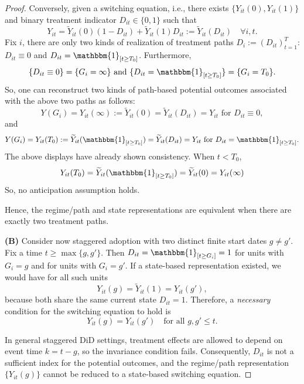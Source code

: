 \documentclass[12pt]{article}
\renewcommand{\(}{\left(}%
\renewcommand{\)}{\right)}%
\renewcommand{\[}{\left[}%
\renewcommand{\]}{\right]}%
\newtheorem{proof}{Proof.}}
\begin{document}
\begin{proof}
\medskip
Conversely, given a switching equation, i.e., there exists $\{Y_{it}(0),Y_{it}(1)\}$ and binary treatment indicator $D_{it}\in\{0,1\}$ such that
\begin{equation*}
Y_{it}=\widetilde Y_{it}(0)(1-D_{it})+\widetilde Y_{it}(1)D_{it}:=\widetilde Y_{it}(D_{it})\quad \forall i,t .
\end{equation*}
Fix $i$, there are only two kinds of realization of treatment paths $D_i:=(D_{it})_{t=1}^T$: $D_{it}\equiv 0$ and $D_{it}=\mathbbm{1}_{[t\geq T_0]}$. Furthermore, 
\begin{equation*}
	  \{D_{it}\equiv 0\}=\{G_i=\infty\} \text{ and }\{D_{it}=\mathbbm{1}_{[t\geq T_0]}\}=\{G_i=T_0\}. 
\end{equation*} 
So, one can reconstruct two kinds of path-based potential outcomes associated with the above two paths as follows:
\begin{equation*}
Y(G_i)=Y_{it}(\infty):=\widetilde Y_{it}(0)=\widetilde Y_{it}(D_{it})=Y_{it}\text{ for }D_{it}\equiv 0,
\end{equation*}
and
\begin{equation*}
	Y(G_i)=Y_{it}(T_0):=\widetilde Y_{it}(\mathbbm{1}_{[t\geq T_0]})=\widetilde Y_{it}(D_{it})=Y_{it}\text{ for }D_{it}=\mathbbm{1}_{[t\geq T_0]}.
\end{equation*}
The above displays have already shown consistency. When $t<T_0$,
\begin{equation*}
	Y_{it}(T_0)=\widetilde Y_{it}(\mathbbm{1}_{[t\geq T_0]})=\widetilde Y_{it}(0)=Y_{it}(\infty)
\end{equation*}
So, no anticipation assumption holds.

Hence, the regime/path and state representations are equivalent when there are exactly two
treatment paths.

\medskip
\noindent
\textbf{(B)}
Consider now staggered adoption with two distinct finite start dates $g\neq g'$.
Fix a time $t\ge \max\{g,g'\}$.
Then $D_{it}=\mathbbm{1}_{[t\ge G_i]}=1$ for units with $G_i=g$ and for units with $G_i=g'$.
If a state-based representation existed, we would have for all such units
\begin{equation*}
Y_{it}(g)=\widetilde  Y_{it}(1)=Y_{it}(g'),
\end{equation*}
because both share the same current state $D_{it}=1$.
Therefore, a \emph{necessary} condition for the switching equation to hold is
\begin{equation*}
Y_{it}(g)=Y_{it}(g') \quad \text{for all } g,g'\le t .
\end{equation*}



In general staggered DiD settings, treatment effects are allowed to depend on
event time $k=t-g$, so the invariance condition fails.
Consequently, $D_{it}$ is not a sufficient index for the potential outcomes,
and the regime/path representation $\{Y_{it}(g)\}$ cannot be reduced to a
state-based switching equation.
\end{proof}
\end{document}
